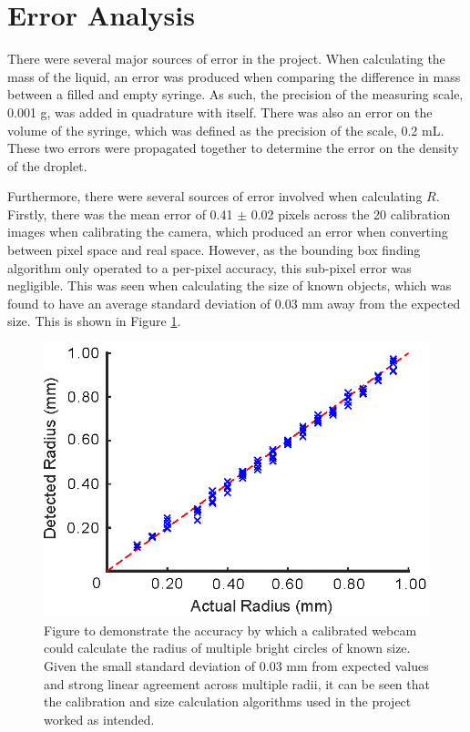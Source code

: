 \documentclass{physics_article_B}
\begin{document}
\section{Error Analysis\label{sect:error}} 
    
    There were several major sources of error in the project. When calculating the mass of the liquid, an error was produced when comparing the difference in mass between a filled and empty syringe. As such, the precision of the measuring scale, 0.001 g, was added in quadrature with itself. There was also an error on the volume of the syringe, which was defined as the precision of the scale, 0.2 mL. These two errors were propagated together to determine the error on the density of the droplet.
    
    Furthermore, there were several sources of error involved when calculating $R$. Firstly, there was the mean error of 0.41 $\pm$ 0.02 pixels across the 20 calibration images when calibrating the camera, which produced an error when converting between pixel space and real space. However, as the bounding box finding algorithm only operated to a per-pixel accuracy, this sub-pixel error was negligible. This was seen when calculating the size of known objects, which was found to have an average standard deviation of 0.03 mm away from the expected size. This is shown in Figure \ref{fig:calib:error}. 
        
            \begin{figure}[H]
                \centering
                \hspace*{-1cm}\includegraphics{Figures/CameraCalib.eps}
                \caption{Figure to demonstrate the accuracy by which a calibrated webcam could calculate the radius of multiple bright circles of known size. Given the small standard deviation of 0.03 mm from expected values and strong linear agreement across multiple radii, it can be seen that the calibration and size calculation algorithms used in the project worked as intended.}
                \label{fig:calib:error}
            \end{figure}
    
\end{document}
